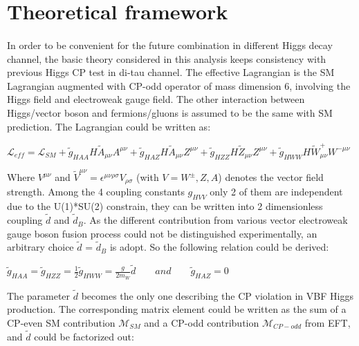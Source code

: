 \section{Theoretical framework}
\label{sec:theory}
\paragraph{}In order to be convenient for the future combination in different Higgs decay channel, the basic theory considered in this analysis keeps consistency with previous Higgs CP test in di-tau channel. The effective Lagrangian is the SM Lagrangian augmented with CP-odd operator of mass dimension 6, involving the Higgs field and electroweak gauge field. The other interaction between Higgs/vector boson and fermions/gluons is assumed to be the same with SM prediction. The Lagrangian could be written as: 

\begin{center}
\begin{math}
\mathcal{L}_{eff} = \mathcal{L}_{SM}+ \tilde{g}_{HAA}H\tilde{A}_{\mu\nu}A^{\mu\nu} + \tilde{g}_{HAZ}H\tilde{A}_{\mu\nu}Z^{\mu\nu} + \tilde{g}_{HZZ}H\tilde{Z}_{\mu\nu}Z^{\mu\nu} + \tilde{g}_{HWW}H\tilde{W}_{\mu\nu}^{+}W^{-\mu\nu}
\end{math}
\end{center}

Where $V^{\mu\nu}$ and $\tilde{V}^{\mu\nu}=\epsilon^{\mu\nu\rho\sigma}V_{\rho\sigma} $ (with $V=W^{\pm},Z,A$) denotes the vector field strength. Among the 4 coupling constants $g_{HVV}$ only 2 of them are independent due to the U(1)*SU(2) constrain, they can be written into 2 dimensionless coupling $\tilde{d}$ and $\tilde{d}_B$. As the different contribution from various vector electroweak gauge boson fusion process could not be distinguished experimentally, an arbitrary choice $\tilde{d}$ = $\tilde{d}_B$ is adopt. So the following relation could be derived: 

\begin{center}
\begin{math}
\tilde{g}_{HAA} = \tilde{g}_{HZZ} = \frac{1}{2} \tilde{g}_{HWW} = \frac{g}{2m_{W}}\tilde{d} \qquad and \qquad \tilde{g}_{HAZ}=0
\end{math}
\end{center}

The parameter $\tilde{d}$ becomes the only one describing the CP violation in VBF Higgs production. The corresponding matrix element could be written as the sum of a CP-even SM contribution $\mathcal{M}_{SM}$ and a CP-odd contribution $\mathcal{M}_{CP-odd}$ from EFT, and $\tilde{d}$ could be factorized out:

